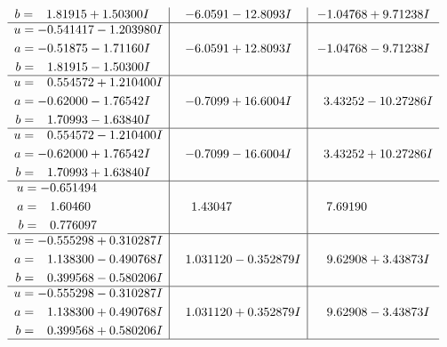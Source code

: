 \documentclass[1p]{elsarticle_modified}
\theoremstyle{definition}
\begin{document}
$$\begin{array}{c|c|c}
\begin{aligned}
b &= \phantom{-}1.81915 + 1.50300 I\end{aligned}
 & -6.0591 - 12.8093 I & -1.04768 + 9.71238 I \\ \hline\begin{aligned}
u &= -0.541417 - 1.203980 I \\
a &= -0.51875 - 1.71160 I \\
b &= \phantom{-}1.81915 - 1.50300 I\end{aligned}
 & -6.0591 + 12.8093 I & -1.04768 - 9.71238 I \\ \hline\begin{aligned}
u &= \phantom{-}0.554572 + 1.210400 I \\
a &= -0.62000 - 1.76542 I \\
b &= \phantom{-}1.70993 - 1.63840 I\end{aligned}
 & -0.7099 + 16.6004 I & \phantom{-}3.43252 - 10.27286 I \\ \hline\begin{aligned}
u &= \phantom{-}0.554572 - 1.210400 I \\
a &= -0.62000 + 1.76542 I \\
b &= \phantom{-}1.70993 + 1.63840 I\end{aligned}
 & -0.7099 - 16.6004 I & \phantom{-}3.43252 + 10.27286 I \\ \hline\begin{aligned}
u &= -0.651494\phantom{ +0.000000I} \\
a &= \phantom{-}1.60460\phantom{ +0.000000I} \\
b &= \phantom{-}0.776097\phantom{ +0.000000I}\end{aligned}
 & \phantom{-}1.43047\phantom{ +0.000000I} & \phantom{-}7.69190\phantom{ +0.000000I} \\ \hline\begin{aligned}
u &= -0.555298 + 0.310287 I \\
a &= \phantom{-}1.138300 - 0.490768 I \\
b &= \phantom{-}0.399568 - 0.580206 I\end{aligned}
 & \phantom{-}1.031120 - 0.352879 I & \phantom{-}9.62908 + 3.43873 I \\ \hline\begin{aligned}
u &= -0.555298 - 0.310287 I \\
a &= \phantom{-}1.138300 + 0.490768 I \\
b &= \phantom{-}0.399568 + 0.580206 I\end{aligned}
 & \phantom{-}1.031120 + 0.352879 I & \phantom{-}9.62908 - 3.43873 I\\
 \hline 
 \end{array}$$\newpage\newpage\renewcommand{\arraystretch}{1}
\end{document}
